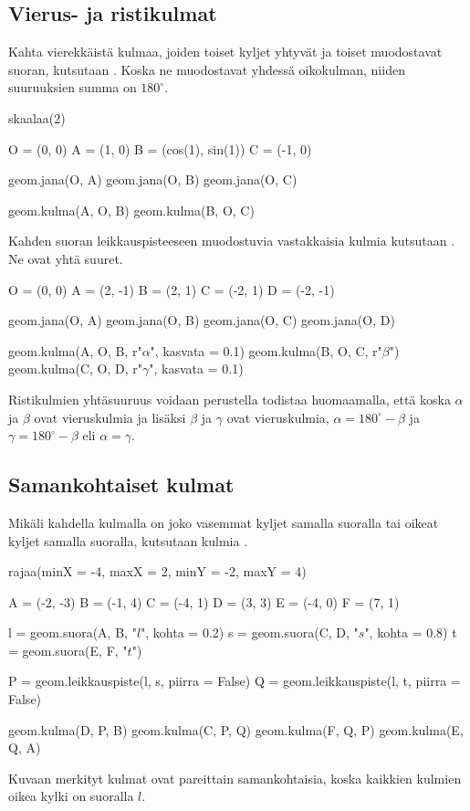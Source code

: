 \subsection*{Vierus- ja ristikulmat}
Kahta vierekkäistä kulmaa, joiden toiset kyljet yhtyvät ja toiset muodostavat suoran, kutsutaan . Koska ne muodostavat yhdessä oikokulman, niiden suuruuksien summa on $180^\circ$. 
\begin{center}
\begin{kuva}
	skaalaa(2)
	
	O = (0, 0)
	A = (1, 0)
	B = (cos(1), sin(1))
	C = (-1, 0)
	
	geom.jana(O, A)
	geom.jana(O, B)
	geom.jana(O, C)
	
	geom.kulma(A, O, B)
	geom.kulma(B, O, C)
\end{kuva}
\end{center}

Kahden suoran leikkauspisteeseen muodostuvia vastakkaisia kulmia kutsutaan . Ne ovat yhtä suuret.
\begin{center}
\begin{kuva}
	O = (0, 0)
	A = (2, -1)
	B = (2, 1)
	C = (-2, 1)
	D = (-2, -1)
	
	geom.jana(O, A)
	geom.jana(O, B)
	geom.jana(O, C)
	geom.jana(O, D)
	
	geom.kulma(A, O, B, r"$\alpha$", kasvata = 0.1)
	geom.kulma(B, O, C, r"$\beta$")
	geom.kulma(C, O, D, r"$\gamma$", kasvata = 0.1)
\end{kuva}
\end{center}
Ristikulmien yhtäsuuruus voidaan perustella todistaa huomaamalla, että koska $\alpha$ ja $\beta$ ovat vieruskulmia ja lisäksi $\beta$ ja $\gamma$ ovat vieruskulmia, $\alpha = 180^\circ - \beta$ ja $\gamma = 180^\circ - \beta$ eli $\alpha = \gamma$.

\subsection*{Samankohtaiset kulmat}
Mikäli kahdella kulmalla on joko vasemmat kyljet samalla suoralla tai oikeat kyljet samalla suoralla, kutsutaan kulmia .

\begin{esimerkki}
\begin{kuva}
	rajaa(minX = -4, maxX = 2, minY = -2, maxY = 4)
	
	A = (-2, -3)
	B = (-1, 4)
	C = (-4, 1)
	D = (3, 3)
	E = (-4, 0)
	F = (7, 1)
	
	l = geom.suora(A, B, "$l$", kohta = 0.2)
	s = geom.suora(C, D, "$s$", kohta = 0.8)
	t = geom.suora(E, F, "$t$")
	
	P = geom.leikkauspiste(l, s, piirra = False)
	Q = geom.leikkauspiste(l, t, piirra = False)
	
	geom.kulma(D, P, B)
	geom.kulma(C, P, Q)
	geom.kulma(F, Q, P)
	geom.kulma(E, Q, A)
\end{kuva}

Kuvaan merkityt kulmat ovat pareittain samankohtaisia, koska kaikkien kulmien oikea kylki on suoralla $l$.
\end{esimerkki}


